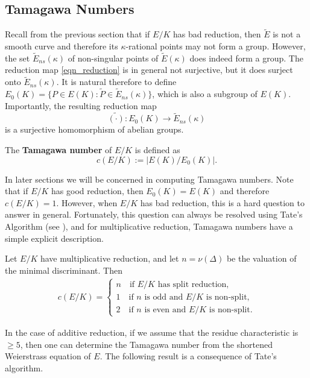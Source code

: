 
\subsection{Tamagawa Numbers} \label{subs_tamagawa}

Recall from the previous section that if $E/K$ has bad reduction, then $\tilde{E}$ is not a smooth curve and therefore its $\kappa$-rational points may not form a group. However, the set $\tilde{E}_{ns}(\kappa)$ of non-singular points of $\tilde{E}(\kappa)$ does indeed form a group. The reduction map \eqref{eqn_reduction} is in general not surjective, but it does surject onto $\tilde{E}_{ns}(\kappa)$. It is natural therefore to define $E_0(K)=\{P\in E(K):\widetilde{P}\in\tilde{E}_{ns}(\kappa)\}$, which is also a subgroup of $E(K)$. Importantly, the resulting reduction map 
$$\widetilde{(\cdot)}:E_0(K)\longrightarrow \tilde{E}_{ns}(\kappa)$$
is a surjective homomorphism of abelian groups.
\begin{defn}
    The \textbf{Tamagawa number} of $E/K$ is defined as
    \begin{equation}
        c(E/K):=|E(K)/E_0(K)|.
    \end{equation}
\end{defn}
In later sections we will be concerned in computing Tamagawa numbers. Note that if $E/K$ has good reduction, then $E_0(K)=E(K)$ and therefore $c(E/K)=1$. However, when $E/K$ has bad reduction, this is a hard question to answer in general. Fortunately, this question can always be resolved using Tate's Algorithm (see \cite[\S IV.9]{S2}), and for multiplicative reduction, Tamagawa numbers have a simple explicit description.

\begin{lemma}\label{lem_mult_tam}
    Let $E/K$ have multiplicative reduction, and let $n=\nu(\Delta)$ be the valuation of the minimal discriminant. Then
    \begin{align*}
        c(E/K)=
        \begin{cases}
            n \quad\text{if $E/K$ has split reduction,}\\
            1 \quad\text{if $n$ is odd and $E/K$ is non-split,}\\
            2 \quad\text{if $n$ is even and $E/K$ is non-split}.
        \end{cases}    
    \end{align*}
\end{lemma}

In the case of additive reduction, if we assume that the residue characteristic is $\geq 5$, then one can determine the Tamagawa number from the shortened Weierstrass equation of $E$. The following result is a consequence of Tate's algorithm.

